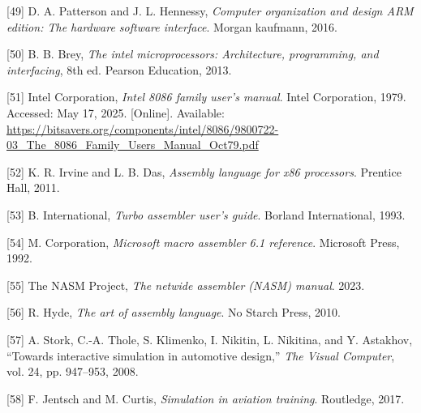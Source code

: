 \documentclass[12pt,oneside]{templates/unerthesis}
\newcommand{\CSLLeftMargin}[1]{#1} %
\newcommand{\CSLRightInline}[1]{#1} %
\newlength{\cslhangindent}
\newenvironment{CSLReferences}[2] %
 {\setlength{\parindent}{0pt}%
  \setlength{\leftskip}{#1 pt\relax}%
  \setlength{\parskip}{#2 pt\relax}%
  \everypar{\setlength{\hangindent}{\cslhangindent}}}
 {\par}
\begin{document}
\begin{CSLReferences}{0}{0}
\leavevmode{}%
\CSLLeftMargin{{[}49{]} }%
\CSLRightInline{D. A. Patterson and J. L. Hennessy, \emph{Computer organization and design ARM edition: The hardware software interface}. Morgan kaufmann, 2016.}

\leavevmode{}%
\CSLLeftMargin{{[}50{]} }%
\CSLRightInline{B. B. Brey, \emph{The intel microprocessors: Architecture, programming, and interfacing}, 8th ed. Pearson Education, 2013.}

\leavevmode{}%
\CSLLeftMargin{{[}51{]} }%
\CSLRightInline{Intel Corporation, \emph{Intel 8086 family user's manual}. Intel Corporation, 1979. Accessed: May 17, 2025. {[}Online{]}. Available: \url{https://bitsavers.org/components/intel/8086/9800722-03_The_8086_Family_Users_Manual_Oct79.pdf}}

\leavevmode{}%
\CSLLeftMargin{{[}52{]} }%
\CSLRightInline{K. R. Irvine and L. B. Das, \emph{Assembly language for x86 processors}. Prentice Hall, 2011.}

\leavevmode{}%
\CSLLeftMargin{{[}53{]} }%
\CSLRightInline{B. International, \emph{Turbo assembler user's guide}. Borland International, 1993.}

\leavevmode{}%
\CSLLeftMargin{{[}54{]} }%
\CSLRightInline{M. Corporation, \emph{Microsoft macro assembler 6.1 reference}. Microsoft Press, 1992.}

\leavevmode{}%
\CSLLeftMargin{{[}55{]} }%
\CSLRightInline{The NASM Project, \emph{The netwide assembler (NASM) manual}. 2023.}

\leavevmode{}%
\CSLLeftMargin{{[}56{]} }%
\CSLRightInline{R. Hyde, \emph{The art of assembly language}. No Starch Press, 2010.}

\leavevmode{}%
\CSLLeftMargin{{[}57{]} }%
\CSLRightInline{A. Stork, C.-A. Thole, S. Klimenko, I. Nikitin, L. Nikitina, and Y. Astakhov, {``Towards interactive simulation in automotive design,''} \emph{The Visual Computer}, vol. 24, pp. 947--953, 2008.}

\leavevmode{}%
\CSLLeftMargin{{[}58{]} }%
\CSLRightInline{F. Jentsch and M. Curtis, \emph{Simulation in aviation training}. Routledge, 2017.}


\end{CSLReferences}
\end{document}
